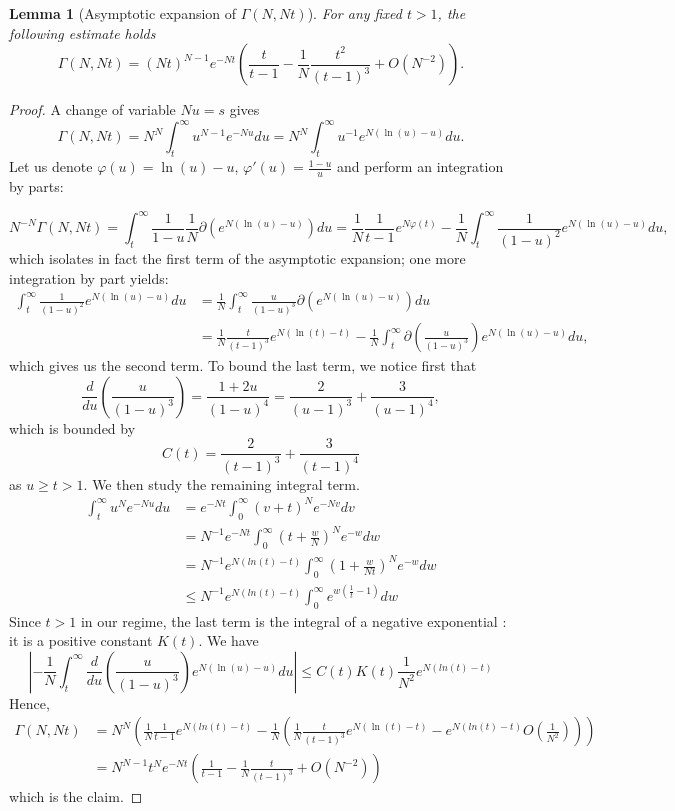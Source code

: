 \documentclass[12pt,a4paper]{amsart}
\theoremstyle{plain} %
\newtheorem{lemma}[theorem]{Lemma}
\begin{document}
\begin{lemma}[Asymptotic expansion of $\Gamma(N,Nt)$] For any fixed $t>1$, the following estimate holds
$$\Gamma(N,Nt) = (Nt)^{N-1} e^{-Nt} \left( \frac{t}{t-1} - \frac{1}{N} \frac{t^2}{(t-1)^3} + O(N^{-2})\right).$$
\end{lemma}


\begin{proof}
A change of variable $Nu = s$ gives
$$\Gamma(N, Nt) = N^N \int_{t}^{\infty} u^{N-1} e^{- N u} du = N^N  \int_{t}^{\infty} u^{-1} e^{ N ( \ln(u) - u ) } du.$$
Let us denote $\varphi(u) = \ln(u) -u$, $\varphi'(u) = \frac{1-u}{u}$ and perform an integration by parts:

$$N^{-N} \Gamma(N, Nt) = \int_{t}^{\infty} \frac{1}{1-u} \frac{1}{N} \partial \left( e^{ N ( \ln(u) - u ) } \right) du
= \frac{1}{N} \frac{1}{t-1} e^{N \varphi(t)} - \frac{1}{N} \int_{t}^{\infty} \frac{1}{(1-u)^2}  e^{ N ( \ln(u) - u ) } du,$$
which isolates in fact the first term of the asymptotic expansion; one more integration by part yields:
\begin{align*}
    \int_{t}^{\infty} \frac{1}{(1-u)^2}  e^{ N ( \ln(u) - u ) } du &= \frac{1}{N}\int_{t}^{\infty} \frac{u}{(1-u)^3}  \partial  \left( e^{ N ( \ln(u) - u ) } \right) du \\
    &= \frac{1}{N} \frac{t}{(t-1)^3} e^{ N ( \ln(t) - t ) } - \frac{1}{N}\int_{t}^{\infty} \partial \left( \frac{u}{(1-u)^3} \right)  e^{ N ( \ln(u) - u ) } du,
\end{align*}
which gives us the second term. To bound the last term, we notice first that 
$$\frac{d}{du} \left( \frac{u}{(1-u)^3} \right) = \frac{1 + 2u}{(1-u)^4} = \frac{2}{(u-1)^3} + \frac{3}{(u-1)^4},$$ 
which is bounded by
$$C(t) = \frac{2}{(t-1)^3} + \frac{3}{(t-1)^4}$$
as $u \geq t > 1$. We then study the remaining integral term.
\begin{align*}
    \int_{t}^{\infty} u^N e^{-Nu} du &= e^{-Nt}\int_{0}^{\infty} (v+t)^N e^{-Nv} dv\\
    &= N^{-1} e^{-Nt}\int_{0}^{\infty} (t + \frac{w}{N})^N e^{-w} dw\\
    &= N^{-1} e^{N(ln(t) -t)}\int_{0}^{\infty} (1 + \frac{w}{Nt})^N e^{-w} dw\\
    &\leq N^{-1} e^{N(ln(t) -t)}\int_{0}^{\infty} e^{w(\frac{1}{t}-1)}dw
\end{align*}
Since $t>1$ in our regime, the last term is the integral of a negative exponential : it is a positive constant $K(t)$. We have 
$$\left| - \frac{1}{N}\int_{t}^{\infty} \frac{d}{du} \left( \frac{u}{(1-u)^3} \right)  e^{ N ( \ln(u) - u ) } du \right| \leq C(t) K(t) \frac{1}{N^2} e^{N(ln(t) -t)}$$
Hence,
\begin{align*}
    \Gamma(N, Nt) &= N^{N}\left( \frac{1}{N} \frac{1}{t-1} e^{N(ln(t)-t)} - \frac{1}{N} (\frac{1}{N} \frac{t}{(t-1)^3} e^{ N ( \ln(t) - t ) } - e^{N(ln(t) -t)}O(\frac{1}{N^2} ))\right)\\
    &= N^{N-1} t^{N} e^{-Nt}\left(  \frac{1}{t-1} - \frac{1}{N} \frac{t}{(t-1)^3}  + O(N^{-2} )\right)
\end{align*}
which is the claim.
\end{proof}
\end{document}
